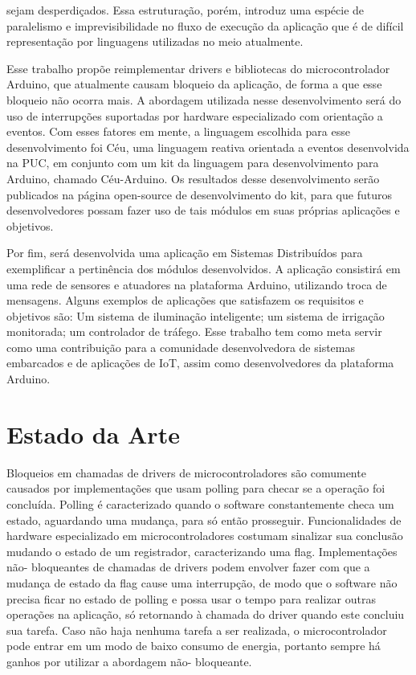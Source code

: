 \documentclass{article}
\begin{document}
sejam desperdiçados. Essa estruturação, porém, introduz uma espécie de paralelismo e imprevisibilidade no
fluxo de execução da aplicação que é de difícil representação por linguagens utilizadas no meio atualmente.
\par Esse trabalho propõe reimplementar drivers e bibliotecas do microcontrolador Arduino, que atualmente causam
bloqueio da aplicação, de forma a que esse bloqueio não ocorra mais. A abordagem utilizada nesse
desenvolvimento será do uso de interrupções suportadas por hardware especializado com orientação a
eventos. Com esses fatores em mente, a linguagem escolhida para esse desenvolvimento foi Céu\cite{santanna2012}, uma linguagem reativa orientada a eventos desenvolvida na PUC, em conjunto com um kit da linguagem para desenvolvimento para Arduino, chamado Céu-Arduino\cite{githubceuarduino}. Os
resultados desse desenvolvimento serão publicados na página open-source de desenvolvimento do
kit, para que futuros desenvolvedores possam fazer uso de tais módulos em suas próprias aplicações
e objetivos.
\par Por fim, será desenvolvida uma aplicação em Sistemas Distribuídos para exemplificar a pertinência
dos módulos desenvolvidos. A aplicação consistirá em uma rede de sensores e atuadores na
plataforma Arduino, utilizando troca de mensagens. Alguns exemplos de aplicações que satisfazem
os requisitos e objetivos são: Um sistema de iluminação inteligente; um sistema de irrigação
monitorada; um controlador de tráfego. Esse trabalho tem como meta servir como uma contribuição
para a comunidade desenvolvedora de sistemas embarcados e de aplicações de IoT, assim como
desenvolvedores da plataforma Arduino. \cite{wortmann2015} \cite{chui2010} \cite{edwards1997} \cite{githubceu} \cite{atmegadatasheet}

\section{Estado da Arte}

\tab Bloqueios em chamadas de drivers de microcontroladores são comumente causados por
implementações que usam polling para checar se a operação foi concluída. Polling é caracterizado
quando o software constantemente checa um estado, aguardando uma mudança, para só então
prosseguir. Funcionalidades de hardware especializado em microcontroladores costumam sinalizar sua
conclusão mudando o estado de um registrador, caracterizando uma flag. Implementações não-
bloqueantes de chamadas de drivers podem envolver fazer com que a mudança de estado da flag cause
uma interrupção, de modo que o software não precisa ficar no estado de polling e possa usar o tempo
para realizar outras operações na aplicação, só retornando à chamada do driver quando este concluiu
sua tarefa. Caso não haja nenhuma tarefa a ser realizada, o microcontrolador pode entrar em um
modo de baixo consumo de energia, portanto sempre há ganhos por utilizar a abordagem não-
bloqueante.
\end{document}
